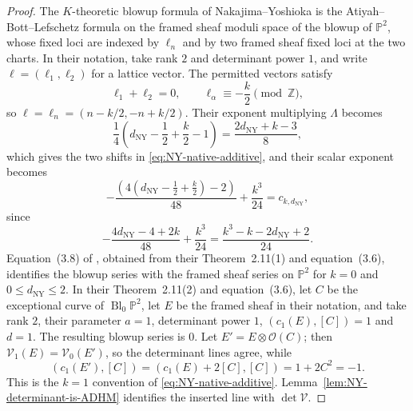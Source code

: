 \documentclass{amsart}
\theoremstyle{definition}
\numberwithin{equation}{section}
\newcommand{\Z}{\mathbb Z}
\newcommand{\cO}{\mathcal O}
\newcommand{\cV}{\mathcal V}
\begin{document}
\begin{proof}
The \(K\)-theoretic blowup formula of Nakajima--Yoshioka \cite{NakajimaYoshiokaII,NakajimaYoshiokaPerverse} is the Atiyah--Bott--Lefschetz formula on the framed sheaf moduli space of the blowup of \(\mathbb P^2\), whose fixed loci are indexed by \(\ell_n\) and by two framed sheaf fixed loci at the two charts.  In their notation, take rank \(2\) and determinant power \(1\), and write \(\ell=(\ell_1,\ell_2)\) for a lattice vector.  The permitted vectors satisfy
\[
 \ell_1+\ell_2=0,\qquad
 \ell_\alpha\equiv-\frac k2\pmod{\Z},
\]
so \(\ell=\ell_n=(n-k/2,-n+k/2)\).  Their exponent multiplying \(\Lambda\) becomes
\[
 \frac14\left(d_{\mathrm{NY}}-\frac12+\frac k2-1\right)
 =\frac{2d_{\mathrm{NY}}+k-3}{8},
\]
which gives the two shifts in \eqref{eq:NY-native-additive}, and their scalar exponent becomes
\[
 -\frac{(4(d_{\mathrm{NY}}-\frac12+\frac k2)-2)}{48}
 +\frac{k^3}{24}=c_{k,d_{\mathrm{NY}}},
\]
since
\[
 -\frac{4d_{\mathrm{NY}}-4+2k}{48}+\frac{k^3}{24}
 =\frac{k^3-k-2d_{\mathrm{NY}}+2}{24}.
\]
Equation~(3.8) of \cite{NakajimaYoshiokaPerverse}, obtained from their Theorem~2.11(1) and equation~(3.6), identifies the blowup series with the framed sheaf series on \(\mathbb P^2\) for \(k=0\) and \(0\leq d_{\mathrm{NY}}\leq2\).  In their Theorem~2.11(2) and equation~(3.6), let \(C\) be the exceptional curve of \(\operatorname{Bl}_0\mathbb P^2\), let \(E\) be the framed sheaf in their notation, and take rank \(2\), their parameter \(a=1\), determinant power \(1\), \((c_1(E),[C])=1\) and \(d=1\).  The resulting blowup series is \(0\).  Let \(E'=E\otimes\cO(C)\); then \(\mathcal V_1(E)=\mathcal V_0(E')\), so the determinant lines agree, while
\[
 (c_1(E'),[C])=(c_1(E)+2[C],[C])=1+2C^2=-1.
\]
This is the \(k=1\) convention of \eqref{eq:NY-native-additive}.  Lemma~\ref{lem:NY-determinant-is-ADHM} identifies the inserted line with \(\det\cV\).
\end{proof}
\end{document}
